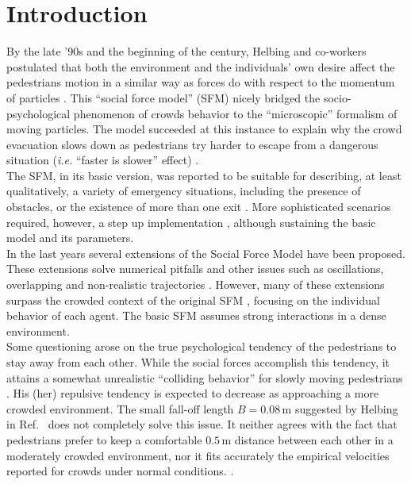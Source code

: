 \section{\label{introduction}Introduction}

By the late '90s and the beginning of the century, Helbing and co-workers 
postulated that both the environment and the individuals' own desire affect 
the pedestrians motion in a similar way as forces do with respect to the 
momentum of particles \cite{Helbing1,Helbing4}. This ``social force model'' 
(SFM) nicely bridged the socio-psychological phenomenon of crowds 
behavior to the ``microscopic'' formalism of moving particles. The model 
succeeded at this instance to explain why the crowd evacuation slows down 
as pedestrians try harder to escape from a dangerous situation 
(\textit{i.e.} ``faster is slower'' effect) \cite{Helbing1,Dorso1,Dorso2}. \\ 

The SFM, in its basic version, was reported to be suitable for describing, 
at least qualitatively, a variety of emergency situations, including the presence
of obstacles, or the existence of more than one exit \cite{Dorso3,Dorso5}.
More sophisticated scenarios required, however, a step up implementation
\cite{Dorso4,Dorso6,Cornes1}, although sustaining the basic model and its parameters.  \\

In the last years several extensions of 
the Social Force Model have been proposed. These extensions solve numerical pitfalls \cite{koster1} 
and other issues such as oscillations, overlapping and non-realistic trajectories
\cite{chraibi1,dietrich1}.
However, many of these extensions surpass the crowded context of the original SFM \cite{Helbing1,Helbing4},
focusing on the individual behavior of each agent. The basic SFM assumes strong interactions
in a dense environment.\\

Some questioning arose on the true psychological tendency of the pedestrians to 
stay away from each other. While the social forces accomplish this tendency, it 
attains a somewhat unrealistic ``colliding behavior'' for slowly moving 
pedestrians \cite{Lakoba}. His (her) repulsive tendency is expected to decrease 
as approaching a more crowded environment. The small fall-off length $B=0.08\,$m 
suggested by Helbing in Ref.~\cite{Helbing1} does not completely solve this 
issue. It neither agrees with the fact that pedestrians prefer to keep a 
comfortable $0.5\,$m distance between each other in a moderately crowded 
environment, nor it fits accurately the empirical velocities reported for 
crowds under normal conditions. \cite{Lakoba}.  \\

